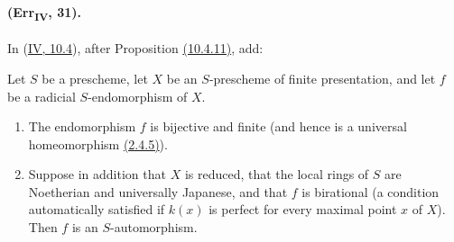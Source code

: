 \paragraph{(Err\textsubscript{IV}, 31).}
In ({\hyperref[subsection:IV.10.4]{IV, 10.4}}), after Proposition {\hyperref[IV.10.4.11]{(10.4.11)}}, add:

\begin{corollary}[10.4.12]
\label{IV.10.4.12}
Let $S$ be a prescheme, let $X$ be an $S$-prescheme of finite
presentation, and let $f$ be a radicial $S$-endomorphism of $X$.
\begin{enumerate}[label=\textup{(\roman*)}]
\item The endomorphism $f$ is bijective and finite (and hence is a
universal homeomorphism {\hyperref[IV.2.4.5]{(2.4.5)}}).
\item Suppose in addition that $X$ is reduced, that the local rings of
$S$ are Noetherian and universally Japanese, and that $f$ is
birational (a condition automatically satisfied if $k(x)$ is perfect
for every maximal point $x$ of $X$).  Then $f$ is an
$S$-automorphism.
\end{enumerate}
\end{corollary}

